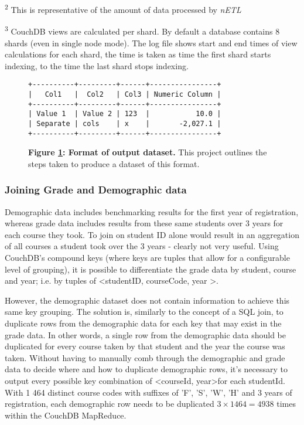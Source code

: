 \begin{table}[h]
\begin{threeparttable}
\begin{tablenotes}
            \item[\textsuperscript{2}]This is representative of the amount of data processed by \textit{nETL}
            \item[\textsuperscript{3}]CouchDB views are calculated per shard. By default a database contains 8 shards (even in single node mode). The log file shows start and end times of view calculations for each shard, the time is taken as time the first shard starts indexing, to the time the last shard stops indexing.
        \end{tablenotes}
    \end{threeparttable}
\end{table}


\begin{figure}[ht]
    \centering
    \begin{verbatim}
+----------+---------+------+----------------+
|   Col1   |  Col2   | Col3 | Numeric Column |
+----------+---------+------+----------------+
| Value 1  | Value 2 | 123  |           10.0 |
| Separate | cols    | x    |       -2,027.1 |
+----------+---------+------+----------------+
    \end{verbatim}
    \caption[Analysis dataset output format]{\textbf{Figure \ref{dataset-output}: Format of output dataset.} This project outlines the steps taken to produce a dataset of this format.}
    \label{dataset-output}
\end{figure}

\subsubsection*{Joining Grade and Demographic data}
Demographic data includes benchmarking results for the first year of registration, whereas grade data includes results from these same students over 3 years for each course they took. To join on student ID alone would result in an aggregation of all courses a student took over the 3 years - clearly not very useful. Using CouchDB's compound keys (where keys are tuples that allow for a configurable level of grouping), it is possible to differentiate the grade data by student, course and year; i.e. by tuples of \textless studentID, courseCode, year \textgreater.

However, the demographic dataset does not contain information to achieve this same key grouping. The solution is, similarly to the concept of a SQL join, to duplicate rows from the demographic data for each key that may exist in the grade data. In other words, a single row from the demographic data should be duplicated for every course taken by that student and the year the course was taken. Without having to manually comb through the demographic and grade data to decide where and how to duplicate demographic rows, it's necessary to output every possible key combination of \textless courseId, year\textgreater for each studentId. With 1 464 distinct course codes with suffixes of 'F', 'S', 'W', 'H' and 3 years of registration, each demographic row needs to be duplicated $ 3 \times 1464 = 4938 $ times within the CouchDB MapReduce.

